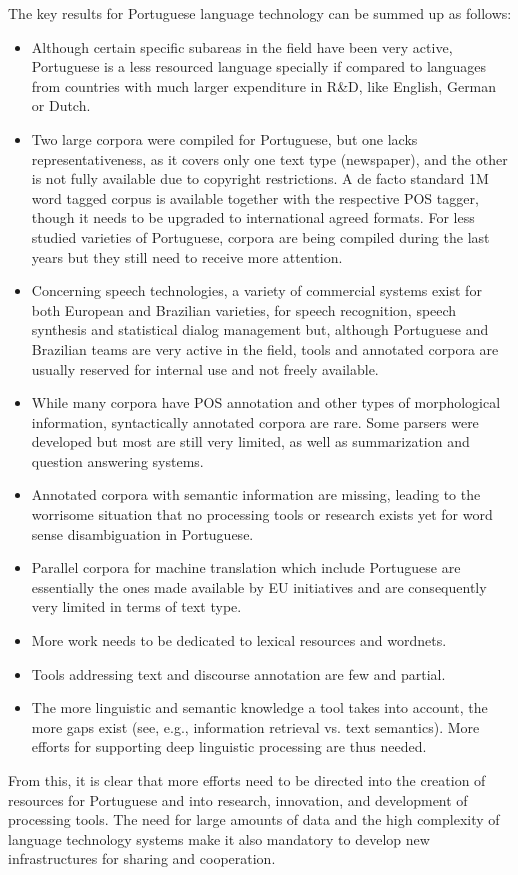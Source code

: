\begin{multicols}{2}
The key results for Portuguese language technology can be summed up as follows:

\begin{itemize}
      \item Although certain specific subareas in the field have been very active, Portuguese is a less resourced language specially if compared to languages from countries with much larger expenditure in R\&D, like English, German or Dutch.
      \item Two large corpora were compiled for Portuguese, but one lacks representativeness, as it covers only one text type (newspaper), and the other is not fully available due to copyright restrictions. A de facto standard 1M word tagged corpus is available together with the respective POS tagger, though it needs to be upgraded to international agreed formats. For less studied varieties of Portuguese, corpora are being compiled during the last years but they still need to receive more attention.
     \item Concerning speech technologies, a variety of commercial systems exist for both European and Brazilian varieties, for speech recognition, speech synthesis and statistical dialog management but, although Portuguese and Brazilian teams are very active in the field, tools and annotated corpora are usually reserved for internal use and not freely available.
    \item While many corpora have POS annotation and other types of morphological information, syntactically annotated corpora are rare. Some parsers were developed but most are still very limited,  as well as summarization and question answering systems.
    \item Annotated corpora with semantic information are missing, leading to the worrisome situation that no processing tools or research exists yet for word sense disambiguation in Portuguese. 
    \item Parallel corpora for machine translation which include Portuguese are essentially the ones made available by EU initiatives and are consequently very limited in terms of text type.
   \item More work needs to be dedicated to lexical resources and wordnets.
   \item Tools addressing text and discourse annotation are few and partial.
   \item The more linguistic and semantic knowledge a tool takes into account, the more gaps exist (see, e.g., information retrieval vs. text semantics). More efforts for supporting deep linguistic processing are thus needed.
    \end{itemize}
   From this, it is clear that more efforts need to be directed into the creation of resources for Portuguese and into research, innovation, and development of processing tools. The need for large amounts of data and the high complexity of language technology systems make it also mandatory to develop new infrastructures for sharing and cooperation.


\end{multicols}
